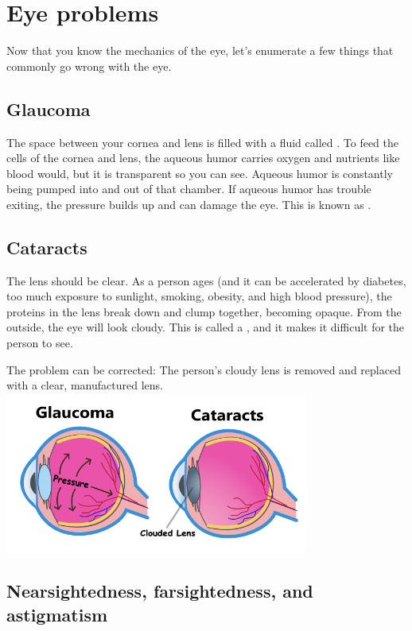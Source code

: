 \section{Eye problems}

Now that you know the mechanics of the eye, let's enumerate a few
things that commonly go wrong with the eye.

\subsection{Glaucoma}

The space between your cornea and lens is filled with a fluid called
. To feed the cells of the cornea and lens,
the aqueous humor carries oxygen and nutrients like blood would, but
it is transparent so you can see. Aqueous humor is constantly being
pumped into and out of that chamber.  If aqueous humor has trouble
exiting, the pressure builds up and can damage the eye. This is known
as .

\subsection{Cataracts}

The lens should be clear. As a person ages (and it can be accelerated
by diabetes, too much exposure to sunlight, smoking, obesity, and high
blood pressure), the proteins in the lens break down and clump
together, becoming opaque. From the outside, the eye will look
cloudy. This is called a , and it makes it difficult
for the person to see.

The problem can be corrected: The person's cloudy lens is removed and
replaced with a clear, manufactured lens.
\includegraphics[width=0.75\textwidth]{Eye_Probs2.png}

\subsection{Nearsightedness, farsightedness, and astigmatism}


